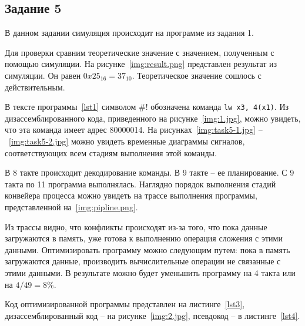 \subsection{Задание 5}

В данном задании симуляция происходит на программе из задания 1. 

Для проверки сравним теоретические значение с значением, полученным с помощью симуляции. На рисунке~\ref{img:result.png} представлен результат из симуляции. Он равен $0x25_{16} = 37_{10}$. Теоретическое значение сошлось с действительным.


В тексте программы~\ref{lst1} символом \#! обозначена команда \texttt{lw x3, 4(x1)}. Из дизассемблированного кода, приведенного на рисунке~\ref{img:1.jpg}, можно увидеть, что эта команда имеет адрес 80000014. На рисунках~\ref{img:task5-1.jpg} --~\ref{img:task5-2.jpg} можно увидеть временные диаграммы сигналов, соответствующих всем стадиям выполнения этой команды. 


В 8 такте происходит декодирование команды. В 9 такте -- ее планирование. С 9 такта по 11 программа выполнялась.
Наглядно порядок выполнения стадий конвейера процесса можно увидеть на трассе выполнения программы, представленной на~\ref{img:pipline.png}.


\newpage
Из трассы видно, что конфликты происходят из-за того, что пока данные загружаются в память, уже готова к выполнению операция сложения с этими данными. Оптимизировать программу можно следующим путем: пока в память загружаются данные, производить вычислительные операции не связанные с этими данными. В результате можно будет уменьшить программу на 4 такта или на $4/49 = 8\%$.

Код оптимизированной программы представлен на листинге~\ref{lst3}, дизассемблированный код -- на рисунке~\ref{img:2.jpg}, псевдокод -- в листинге~\ref{lst4}.

